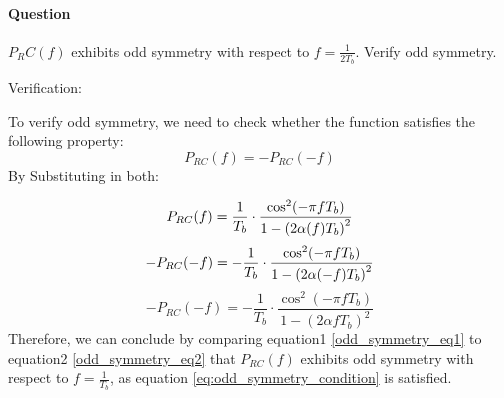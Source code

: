 \documentclass[14pt,a4paper]{report}
\newcounter{question}
\newcommand*\question{%
\stepcounter{question}%
\paragraph{Question \thequestion}}
\begin{document}
\question
{
    $P_RC (f )$ exhibits odd symmetry with respect to $f = \frac{1}{2T_{b}} $. Verify odd symmetry.
}
\begin{answer_box*}

    Verification:

    To verify odd symmetry, we need to check whether the function satisfies the following property:
    \begin{equation}
        P_{RC}(f) = -P_{RC}(-f) \label{eq:odd_symmetry_condition}
    \end{equation}
    By Substituting in both:

    \begin{equation}
        P_{RC}(f) =  \frac{1}{T_b} \cdot \frac{\cos^2(-\pi f T_b)}{1 - \left({2\alpha (f)}{T_b}\right)^2} \label{odd_symmetry_eq1}  \\
    \end{equation}
    \begin{equation}
        -P_{RC}(-f) = - \frac{1}{T_b} \cdot \frac{\cos^2(-\pi f T_b)}{1 - \left({2\alpha (-f)}{T_b}\right)^2} \\
    \end{equation}  
    \begin{equation}
        -P_{RC}(-f) = - \frac{1}{T_b} \cdot \frac{\cos^2(-\pi f T_b)}{1 - \left({2\alpha f}{T_b}\right)^2} \label{odd_symmetry_eq2}
    \end{equation}
    Therefore, we can conclude by comparing equation1 \ref{odd_symmetry_eq1} to equation2 \ref{odd_symmetry_eq2} that $P_{RC}(f)$ exhibits odd symmetry with respect to $f = \frac{1}{T_b}$, as equation \ref{eq:odd_symmetry_condition} is satisfied.
\end{answer_box*}
\end{document}

